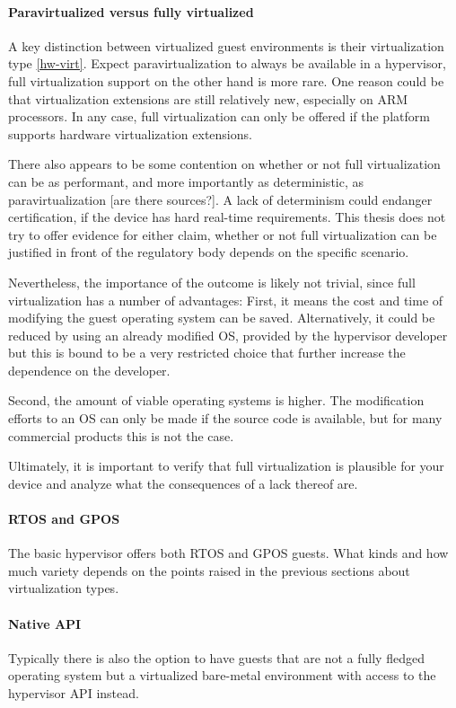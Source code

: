 \paragraph{Paravirtualized versus fully virtualized}
A key distinction between virtualized guest environments is their virtualization type \ref{hw-virt}. Expect paravirtualization to always be available in a hypervisor, full virtualization support on the other hand is more rare. One reason could be that virtualization extensions are still relatively new, especially on ARM processors. In any case, full virtualization can only be offered if the platform supports hardware virtualization extensions.

There also appears to be some contention on whether or not full virtualization can be as performant, and more importantly as deterministic, as paravirtualization [are there sources?]. A lack of determinism could endanger certification, if the device has hard real-time requirements. This thesis does not try to offer evidence for either claim, whether or not full virtualization can be justified in front of the regulatory body depends on the specific scenario. 

Nevertheless, the importance of the outcome is likely not trivial, since full virtualization has a number of advantages: First, it means the cost and time of modifying the guest operating system can be saved. Alternatively, it could be reduced by using an already modified \gls{OS}, provided by the hypervisor developer but this is bound to be a very restricted choice that further increase the dependence on the developer.

Second, the amount of viable operating systems is higher. The modification efforts to an \gls{OS} can only be made if the source code is available, but for many commercial products this is not the case. 

Ultimately, it is important to verify that full virtualization is plausible for your device and analyze what the consequences of a lack thereof are.
\paragraph{\gls{RTOS} and \gls{GPOS}}
The basic hypervisor offers both \gls{RTOS} and \gls{GPOS} guests. What kinds and how much variety depends on the points raised in the previous sections about virtualization types. 
\paragraph{Native \gls{API}}
Typically there is also the option to have guests that are not a fully fledged operating system but a virtualized bare-metal environment with access to the hypervisor \gls{API} instead. 

